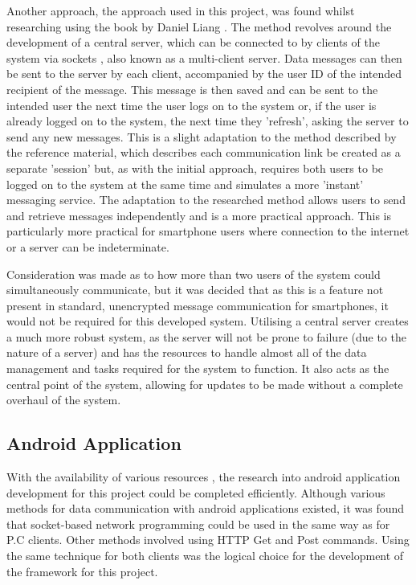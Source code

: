 \documentclass[a4paper,12pt]{report}
\begin{document}
Another approach, the approach used in this project, was found whilst researching using the book by Daniel Liang \cite{ydanielliang}. The method revolves around the development of a central server, which can be connected to by clients of the system via sockets \cite{javanetworking}, also known as a multi-client server. Data messages can then be sent to the server by each client, accompanied by the user ID of the intended recipient of the message. This message is then saved and can be sent to the intended user the next time the user logs on to the system or, if the user is already logged on to the system, the next time they 'refresh', asking the server to send any new messages. This is a slight adaptation to the method described by the reference material, which describes each communication link be created as a separate 'session' but, as with the initial approach, requires both users to be logged on to the system at the same time and simulates a more 'instant' messaging service. The adaptation to the researched method allows users to send and retrieve messages independently and is a more practical approach. This is particularly more practical for smartphone users where connection to the internet or a server can be indeterminate. 

Consideration was made as to how more than two users of the system could simultaneously communicate, but it was decided that as this is a feature not present in standard, unencrypted message communication for smartphones, it would not be required for this developed system. Utilising a central server creates a much more robust system, as the server will not be prone to failure (due to the nature of a server) and has the resources to handle almost all of the data management and tasks required for the system to function. It also acts as the central point of the system, allowing for updates to be made without a complete overhaul of the system. 

\subsection{Android Application}


With the availability of various resources \cite{androiddevelopers} \cite{markogargenta}, the research into android application development for this project could be completed efficiently. Although various methods for data communication with android applications existed, it was found that socket-based network programming could be used in the same way as for P.C clients. Other methods involved using HTTP Get and Post commands. Using the same technique for both clients was the logical choice for the development of the framework for this project.
\end{document}
